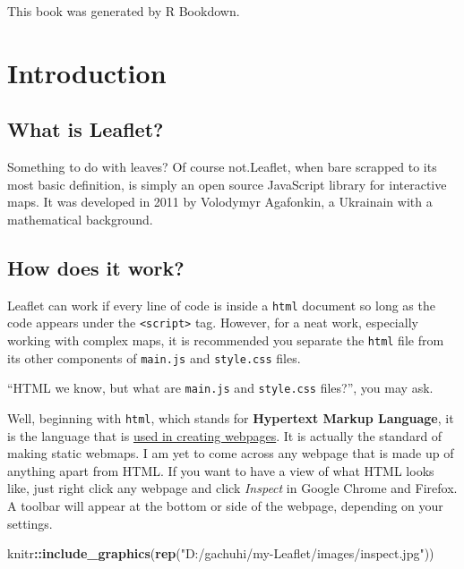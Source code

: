 \documentclass[
]{book}
\newenvironment{Shaded}{\begin{snugshade}}{\end{snugshade}}
\newcommand{\FunctionTok}[1]{\textcolor[rgb]{0.13,0.29,0.53}{\textbf{#1}}}
\newcommand{\NormalTok}[1]{#1}
\newcommand{\SpecialCharTok}[1]{\textcolor[rgb]{0.81,0.36,0.00}{\textbf{#1}}}
\newcommand{\StringTok}[1]{\textcolor[rgb]{0.31,0.60,0.02}{#1}}
\begin{document}
This book was generated by R Bookdown.

\hypertarget{introduction}{%
\chapter{Introduction}\label{introduction}}

\hypertarget{what-is-leaflet}{%
\section{What is Leaflet?}\label{what-is-leaflet}}

Something to do with leaves? Of course not.Leaflet, when bare scrapped to its most basic definition, is simply an open source JavaScript library for interactive maps. It was developed in 2011 by Volodymyr Agafonkin, a Ukrainain with a mathematical background.

\hypertarget{how-does-it-work}{%
\section{How does it work?}\label{how-does-it-work}}

Leaflet can work if every line of code is inside a \texttt{html} document so long as the code appears under the \texttt{\textless{}script\textgreater{}} tag. However, for a neat work, especially working with complex maps, it is recommended you separate the \texttt{html} file from its other components of \texttt{main.js} and \texttt{style.css} files.

``HTML we know, but what are \texttt{main.js} and \texttt{style.css} files?'', you may ask.

Well, beginning with \texttt{html}, which stands for \textbf{Hypertext Markup Language}, it is the language that is \href{https://www.tutorialspoint.com/html/index.htm}{used in creating webpages}. It is actually the standard of making static webmaps. I am yet to come across any webpage that is made up of anything apart from HTML. If you want to have a view of what HTML looks like, just right click any webpage and click \emph{Inspect} in Google Chrome and Firefox. A toolbar will appear at the bottom or side of the webpage, depending on your settings.

\begin{Shaded}
\begin{Highlighting}[]
\NormalTok{knitr}\SpecialCharTok{::}\FunctionTok{include\_graphics}\NormalTok{(}\FunctionTok{rep}\NormalTok{(}\StringTok{"D:/gachuhi/my{-}Leaflet/images/inspect.jpg"}\NormalTok{))}
\end{Highlighting}
\end{Shaded}
\end{document}
